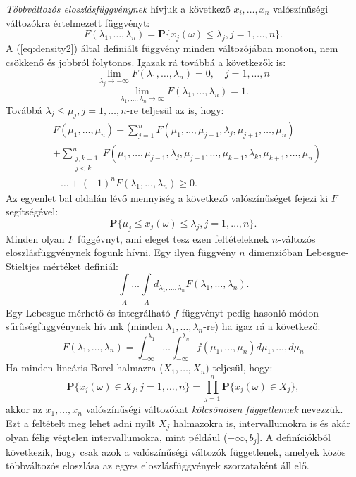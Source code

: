 \documentclass{article}
\begin{document}
\textit{Többváltozós eloszlásfüggvénynek} hívjuk a következő $x_i,\ldots,x_n$ valószínűségi változókra értelmezett függvényt:
\begin{equation}
	F(\lambda_1,\ldots,\lambda_n)=\mathbf{P}\{x_j(\omega) \leq \lambda_j, j = 1,\ldots,n\}.
	\label{eq:density2}
\end{equation}
A (\ref{eq:density2}) által definiált függvény minden változójában monoton, nem csökkenő és jobbról folytonos. Igazak rá továbbá a következők is:
\[
\lim_{\lambda_j \to -\infty} F(\lambda_1,\ldots,\lambda_n) = 0, \quad j = 1,\ldots,n
\]
\[
\lim_{\lambda_1,\ldots,\lambda_n \to \infty} F(\lambda_1,\ldots,\lambda_n) = 1.
\]
Továbbá $\lambda_j \leq \mu_j, j = 1,\ldots,n$-re teljesül az is, hogy:
\begin{align*}
    &F(\mu_1,\ldots,\mu_n) - \sum^{n}_{j=1} F(\mu_1,\ldots,\mu_{j-1},\lambda_j,\mu_{j+1},\ldots,\mu_{n}) \\
    &+ \sum^{n}_{\substack{j,k=1 \\ j < k}} F(\mu_1,\ldots,\mu_{j-1},\lambda_j,\mu_{j+1},\ldots,\mu_{k-1},\lambda_k,\mu_{k+1},\ldots,\mu_{n}) \\
    &- \ldots + (-1)^{n} F(\lambda_1,\ldots,\lambda_n) \geq 0.
\end{align*}
Az egyenlet bal oldalán lévő mennyiség a következő valószínűséget fejezi ki $F$ segítségével:
\[
 \mathbf{P}\{\mu_{j} \leq x_j(\omega) \leq \lambda_j, j = 1,\ldots,n\}.
\]
Minden olyan $F$ függévnyt, ami eleget tesz ezen feltételeknek $n$-változós eloszlásfüggvénynek fogunk hívni. Egy ilyen függvény $n$ dimenzióban Lebesgue-Stieltjes mértéket definiál:
\[
	\int\limits_{\substack{A}} \ldots \int\limits_{\substack{A}} d_{\lambda_1,\ldots,\lambda_n} F(\lambda_1,\ldots,\lambda_n).
\]
Egy Lebesgue mérhető és integrálható $f$ függvényt pedig hasonló módon sűrűségfüggvénynek hívunk (minden $\lambda_1,\ldots,\lambda_n$-re) ha igaz rá a következő:
\begin{equation}
	F(\lambda_1,\ldots,\lambda_n) = \int^{\lambda_1}_{-\infty} \ldots \int^{\lambda_n}_{-\infty} f(\mu_1,\ldots,\mu_{n})d\mu_1,\ldots,d\mu_{n}
\end{equation}
Ha minden lineáris Borel halmazra ($X_1,\ldots,X_n$) teljesül, hogy:
\begin{equation}
	\mathbf{P}\{x_j(\omega) \in X_j, j = 1,\ldots,n \} = \prod_{j=1}^{n} \mathbf{P}\{x_j(\omega) \in X_j\},
	\label{eq:kfvv}
\end{equation}
akkor az $x_1,\ldots,x_n$ valószínűségi változókat \textit{kölcsönösen függetlennek} nevezzük. Ezt a feltételt meg lehet adni nyílt $X_j$ halmazokra is, intervallumokra is és akár olyan félig végtelen intervallumokra, mint például ($-\infty,b_j$]. A definíciókból következik, hogy csak azok a valószínűségi változók függetlenek, amelyek közös többváltozós eloszlása az egyes eloszlásfüggvények szorzataként áll elő. 
\end{document}
